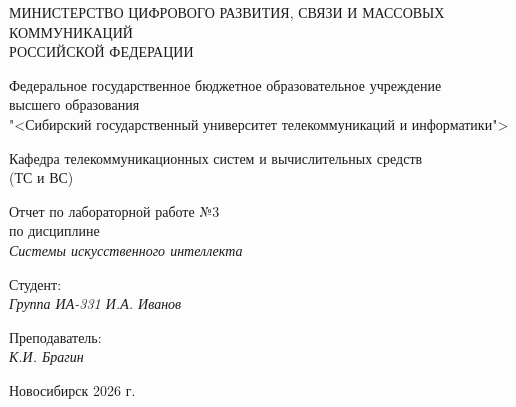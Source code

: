 \thispagestyle{empty}

\begin{center}
    МИНИСТЕРСТВО ЦИФРОВОГО РАЗВИТИЯ, СВЯЗИ И МАССОВЫХ КОММУНИКАЦИЙ \\ РОССИЙСКОЙ ФЕДЕРАЦИИ
    
    \vspace{20pt}
    
    Федеральное государственное бюджетное образовательное учреждение  \\  высшего образования \\
    "<Сибирский государственный университет телекоммуникаций и информатики"> \\
    
    \vspace{20pt}
    
    Кафедра телекоммуникационных систем и вычислительных средств \\  (ТС и ВС)
\end{center}

\vfill

\begin{center}
    Отчет по лабораторной работе №3  \\  
    по дисциплине \\
    \textit{Системы искусственного интеллекта}
    \vspace{20pt}
\end{center}

\vfill

    \noindent Студент: \\
    \textit{Группа ИА-331 \hfill И.А. Иванов}
    
    \vspace{20pt}

    \vspace{20pt}
    
    \noindent Преподаватель: \\
    \textit{\hfill К.И. Брагин}
    
\vfill

\begin{center}
    Новосибирск 2026 г.
\end{center}